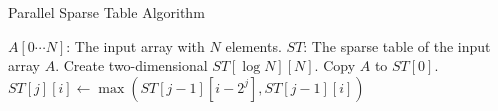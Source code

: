 \begin{algorithm}[!thb]
  \caption{Parallel Sparse Table Algorithm}
  \label{alg:parallel-sparse-table}
  \begin{algorithmic}[1]
    \Require
      $A[0 \cdots N]$: The input array with $N$ elements.
    \Ensure
      $ST$: The sparse table of the input array $A$.
    \State Create two-dimensional $ST[\log N][N]$.
    \State Copy $A$ to $ST[0]$.
        \State $ST[j][i] \gets \max(ST[j-1][i-2^{j}], ST[j-1][i])$
      \EndParFor
    \EndFor
  \end{algorithmic}
\end{algorithm}